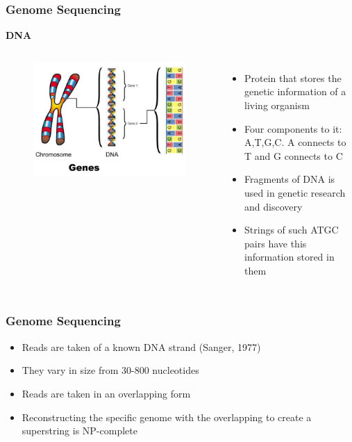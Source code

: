 \documentclass{beamer}
\begin{document}

\begin{frame}
\frametitle{Genome Sequencing}
\textbf{DNA}
\begin{columns}[c]


\begin{figure}[h]
\includegraphics[scale = 0.35]{dna.jpg}
\end{figure}



\begin{itemize}
\item Protein that stores the genetic information of a living organism
\pause
\item Four components to it: A,T,G,C. A connects to T and G connects to C
\pause
\item Fragments of DNA is used in genetic research and discovery
\item Strings of such {\color{red}ATGC} pairs have this information stored in them
\pause
\end{itemize}


\end{columns}
\end{frame}


\begin{frame}
\frametitle{Genome Sequencing}
\begin{itemize}
\item Reads are taken of a known DNA strand (Sanger, 1977)
\item They vary in size from 30-800 nucleotides
\item Reads are taken in an overlapping form
\item Reconstructing the specific genome with the overlapping to create a superstring is NP-complete
\end{itemize}
\end{frame}
\end{document}
